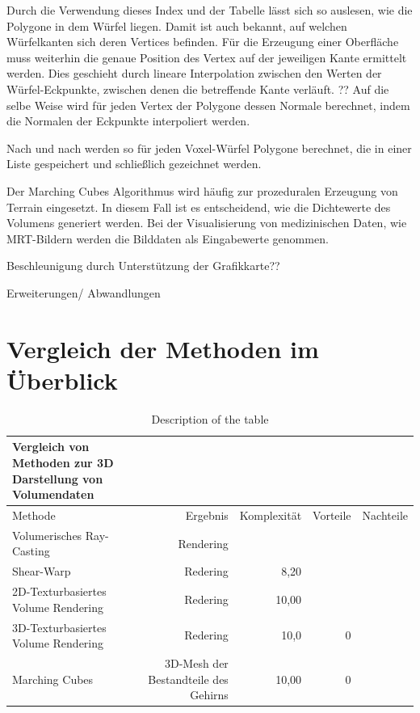 Durch die Verwendung dieses Index und der Tabelle lässt sich so auslesen, wie die Polygone in dem Würfel liegen. Damit ist auch bekannt, auf welchen Würfelkanten sich deren Vertices befinden. Für die Erzeugung einer Oberfläche muss weiterhin die genaue Position des Vertex auf der jeweiligen Kante ermittelt werden. Dies geschieht durch lineare Interpolation zwischen den Werten der Würfel-Eckpunkte, zwischen denen die betreffende Kante verläuft. ??
Auf die selbe Weise wird für jeden Vertex der Polygone dessen Normale berechnet, indem die Normalen der Eckpunkte interpoliert werden.

Nach und nach werden so für jeden Voxel-Würfel Polygone berechnet, die in einer Liste gespeichert und schließlich gezeichnet werden.

Der Marching Cubes Algorithmus wird häufig zur prozeduralen Erzeugung von Terrain eingesetzt. In diesem Fall ist es entscheidend, wie die Dichtewerte des Volumens generiert werden. Bei der Visualisierung von medizinischen Daten, wie MRT-Bildern werden die Bilddaten als Eingabewerte genommen.

Beschleunigung durch Unterstützung der Grafikkarte??

Erweiterungen/ Abwandlungen


\section{Vergleich der Methoden im Überblick}											 %
\begin{table}
\centering
\begin{tabular}{lrrrr}
\toprule
Vergleich von Methoden zur 3D Darstellung von Volumendaten\\  
\midrule 
Methode & Ergebnis & Komplexität & Vorteile & Nachteile \\ 
\midrule 
Volumerisches Ray-Casting & Rendering &  & & \\
Shear-Warp & Redering & 8,20 & & \\
2D-Texturbasiertes Volume Rendering & Redering  & 10,00 & & \\ 
3D-Texturbasiertes Volume Rendering & Redering  & 10,0 & 0 &\\ 
Marching Cubes & 3D-Mesh der Bestandteile des Gehirns  & 10,00 & 0 &\\ 
\bottomrule
\end{tabular}
\caption{Description of the table}\label{volumeRenderingVergleich}
\end{table}

